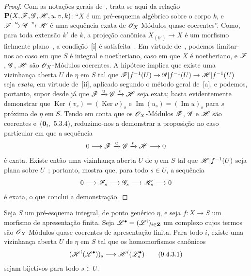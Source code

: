 \begin{proof}
Com as notações gerais de~, trata-se aqui da relação $\mathbf{P}(X,\mathscr{F},\mathscr{G},\mathscr{H},u,v,k)$: ``$X$ é um pré-esquema algébrico sobre o corpo $k$, e $\mathscr{F}\xrightarrow{u}\mathscr{G}\xrightarrow{v}\mathscr{H}$ é uma sequência exata de $\mathscr{O}_X$-Módulos quase-coerentes''.
Como, para toda extensão $k'$ de $k$, a projeção canônica $X_{(k')}\to X$ é um morfismo fielmente plano~, a condição~[i] é satisfeita~.
Em virtude de~, podemos limitar-nos ao caso em que $S$ é integral e noetheriano, caso em que $X$ é noetheriano, e $\mathscr{F}$, $\mathscr{G}$, $\mathscr{H}$ são $\mathscr{O}_X$-Módulos coerentes.
A hipótese implica que existe uma vizinhança aberta $U$ de $\eta$ em $S$ tal que $\sh{F}|f^{-1}(U)\to\sh{G}|f^{-1}(U)\to\sh{H}|f^{-1}(U)$ seja \emph{exata}, em virtude de~[ii], aplicado segundo o método geral de~[a], e podemos, portanto, supor desde já que $\mathscr{F}\xrightarrow{u}\mathscr{G}\xrightarrow{v}\mathscr{H}$ seja exata; basta evidentemente demonstrar que $\operatorname{Ker}(v_s)=(\operatorname{Ker} v)_s$ e $\operatorname{Im}(u_s)=(\operatorname{Im} u)_s$ para $s$ próximo de $\eta$ em $S$.
Tendo em conta que os $\mathscr{O}_X$-Módulos $\mathscr{F}$, $\mathscr{G}$ e $\mathscr{H}$ são coerentes e~($\mathbf{0}_{\mathrm{I}}$,~5.3.4), reduzimo-nos a demonstrar a proposição no caso particular em que a sequência
\[
 0\longrightarrow\mathscr{F}\xrightarrow{u}\mathscr{G}\xrightarrow{v}\mathscr{H}
 \longrightarrow0
\]
é exata.
Existe então uma vizinhança aberta $U$ de $\eta$ em $S$ tal que
$\mathscr{H}|f^{-1}(U)$ seja plana sobre $U$~; portanto, 
mostra que, para todo $s\in U$, a sequência
\[
 0\longrightarrow\mathscr{F}_s\longrightarrow\mathscr{G}_s\longrightarrow\mathscr{H}_s
 \longrightarrow0
\]
é exata, o que conclui a demonstração.
\end{proof}

\begin{corollary}[9.4.3]
\label{IV.9.4.3}
Seja $S$ um pré-esquema integral, de ponto genérico $\eta$, e seja $f:X\to S$ um morfismo de apresentação finita.
Seja $\mathscr{L}^\bullet=(\mathscr{L}^i)_{i\in\mathbf{Z}}$ um complexo cujos termos são $\mathscr{O}_X$-Módulos quase-coerentes de apresentação finita.
Para todo $i$, existe uma vizinhança aberta $U$ de $\eta$ em $S$ tal que os homomorfismos canônicos
\begin{equation}
\label{IV.9.4.3.1}
  (\sh{H}^i(\sh{L}^\bullet))_s\to\sh{H}^i(\sh{L}^\bullet_s) \tag{9.4.3.1}
\end{equation}
sejam bijetivos para todo $s\in U$.
\end{corollary}


